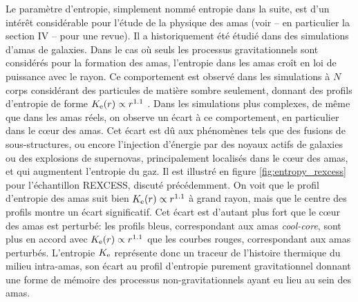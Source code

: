 Le paramètre d'entropie, simplement nommé entropie dans la suite, est d'un intérêt considérable pour l'étude de la physique des amas (voir \cite{voit_tracing_2005} -- en particulier la section IV -- pour une revue).
Il a historiquement été étudié dans des simulations d'amas de galaxies.
Dans le cas où seuls les processus gravitationnels sont considérés pour la formation des amas, l'entropie dans les amas croît en loi de puissance avec le rayon.
Ce comportement est observé dans les simulations à $N$ corps considérant des particules de matière sombre seulement, donnant des profils d'entropie de forme $K_{\rm e}(r) \propto r^{1.1}$ \cite{voit_tracing_2005}.
Dans les simulations plus complexes, de même que dans les amas réels, on observe un écart à ce comportement, en particulier dans le cœur des amas.
Cet écart est dû aux phénomènes tels que des fusions de sous-structures, ou encore l'injection d'énergie par des noyaux actifs de galaxies ou des explosions de supernovas, principalement localisés dans le cœur des amas, et qui augmentent l'entropie du gaz.
Il est illustré en figure \ref{fig:entropy_rexcess} pour l'échantillon REXCESS, discuté précédemment.
On voit que le profil d'entropie des amas suit bien $K_{\rm e}(r) \propto r^{1.1}$ à grand rayon, mais que le centre des profils montre un écart significatif.
Cet écart est d'autant plus fort que le cœur des amas est perturbé: les profils bleus, correspondant aux amas \textit{cool-core}, sont plus en accord avec $K_{\rm e}(r) \propto r^{1.1}$ que les courbes rouges, correspondant aux amas perturbés.
L'entropie $K_{\rm e}$ représente donc un traceur de l'histoire thermique du milieu intra-amas, son écart au profil d'entropie purement gravitationnel donnant une forme de mémoire des processus non-gravitationnels ayant eu lieu au sein des amas.

